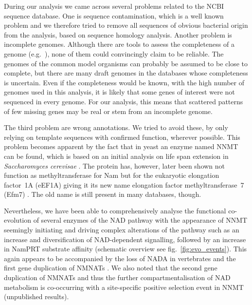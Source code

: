 During our analysis we came across several problems related to the NCBI sequence database. One is sequence contamination, which is a well known problem  and we therefore tried to remove all sequences of obvious bacterial origin from the analysis, based on sequence homology analysis. Another problem is incomplete genomes. Although there are tools to assess the completeness of a genome (e.g.~\cite{Simao2015}), none of them could convincingly claim to be reliable. The genomes of the common model organisms can probably be assumed to be close to complete, but there are many draft genomes in the databases whose completeness is uncertain. Even if the completeness would be known, with the high number of genomes used in this analysis, it is likely that some genes of interest were not sequenced in every genome. For our analysis, this means that scattered patterns of few missing genes may be real or stem from an incomplete genome.

The third problem are wrong annotations. We tried to avoid these, by only relying on template sequences with confirmed function, wherever possible. This problem becomes apparent by the fact that in yeast an enzyme named NNMT can be found, which is based on an initial analysis on life span extension in \textit{Saccharomyces cerevisae} \cite{Anderson2003}. The protein has, however, later been shown not function as methyltransferase for Nam but for the eukaryotic elongation factor~1A (eEF1A) giving it its new name elongation factor methyltransferase~7 (Efm7) \cite{Hamey2016}. The old name is still present in many databases, though.

Nevertheless, we have been able to comprehensively analyse the functional co-evolution of several enzymes of the NAD pathway with the appearance of NNMT seemingly initiating and driving complex alterations of the pathway such as an increase and diversification of NAD-dependent signalling, followed by an increase in NamPRT substrate affinity (schematic overview see fig.~\ref{fig:evo_events}). This again appears to be accompanied by the loss of NADA in vertebrates and the first gene duplication of NMNATs \cite{Lau2010}. We also noted that the second gene duplication of NMNATs and thus the further compartmentalisation of NAD metabolism is co-occurring with a site-specific positive selection event in NNMT (unpublished results). 

